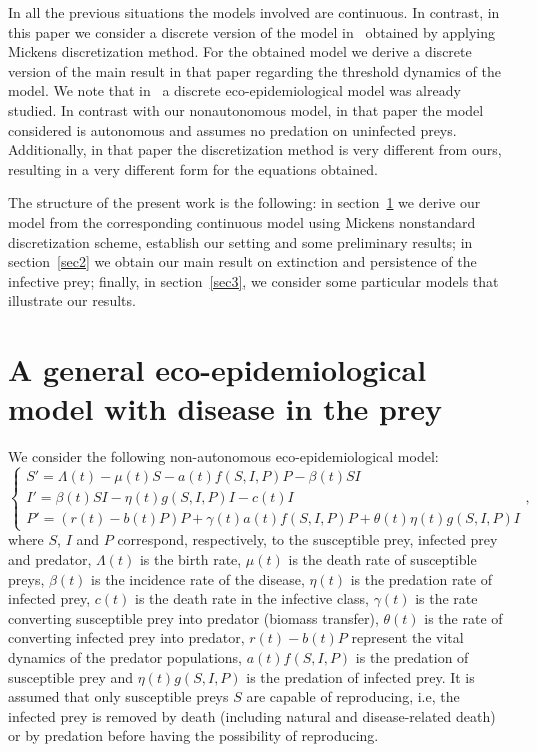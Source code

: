 \documentclass[reqno]{amsart}
\begin{document}
{In all the previous situations the models involved are continuous. In contrast, in this paper we consider a discrete version of the model in~\cite{Jesus-Silva-Vilarinho-preprint2-2020} obtained by applying Mickens discretization method. For the obtained model we derive a discrete version of the main result in that paper regarding the threshold dynamics of the model. We note that in~\cite{Hu-Teng-Jia-Zhang-ADE-2014} a discrete eco-epidemiological model was already studied. In contrast with our nonautonomous model, in that paper the model considered is autonomous and assumes no predation on uninfected preys. Additionally, in that paper the discretization method is very different from ours, resulting in a very different form for the equations obtained.}

{The structure of the present work is the following: in section~\ref{sec-1} we derive our model from the corresponding continuous model using Mickens nonstandard discretization scheme, establish our setting and some preliminary results; in section~\ref{sec2} we obtain our main result on extinction and persistence of the infective prey; finally, in section~\ref{sec3}, we consider some particular models that illustrate our results.}

\section{A general eco-epidemiological model with disease in {the} prey}\label{sec-1}

We consider the following non-autonomous eco-epidemiological model:
\begin{equation}\label{eq:principal}
\begin{cases}
S'=\Lambda(t)-\mu(t)S-a(t){f(S,I,P)P}-\beta(t)SI\\
I'=\beta(t)SI-\eta(t)g(S,I,P)I-c(t)I\\
P'=(r(t)-b(t)P)P+\gamma(t)a(t){f(S,I,P)P}+\theta(t)\eta(t)g(S,I,P)I
\end{cases},
\end{equation}
where $S$, $I$ and $P$ correspond, respectively, to the susceptible prey, infected prey and predator, $\Lambda(t)$ is the birth rate, $\mu(t)$ is the death rate of susceptible preys, $\beta(t)$ is the incidence rate of the disease, $\eta(t)$ is the predation rate of infected prey, $c(t)$ is the death rate in the infective class, $\gamma(t)$ is the
rate converting susceptible prey into predator (biomass transfer), $\theta(t)$ is the rate of converting infected prey into predator, $r(t)-b(t)P$ represent the vital dynamics of the predator populations, $a(t)f(S,I,P)$ is the predation of susceptible prey and  $\eta(t)g(S,I,P)$ is the predation of infected prey. It is assumed that only susceptible preys $S$ are capable of reproducing, i.e, the infected prey is removed by death (including natural and disease-related death) or by predation before having the possibility of reproducing.
\end{document}

